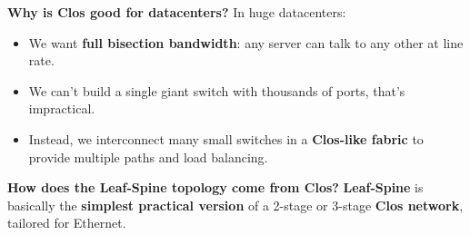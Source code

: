 \highspace
\textcolor{Green3}{ \textbf{Why is Clos good for datacenters?}} In huge datacenters:
\begin{itemize}
    \item We want \textbf{full bisection bandwidth}: any server can talk to any other at line rate.
    \item We can't build a single giant switch with thousands of ports, that's impractical.
    \item Instead, we interconnect many small switches in a \textbf{Clos-like fabric} to provide multiple paths and load balancing.
\end{itemize}

\highspace
\textcolor{Green3}{ \textbf{How does the Leaf-Spine topology come from Clos?}} \textbf{Leaf-Spine} is basically the \textbf{simplest practical version} of a 2-stage or 3-stage \textbf{Clos network}, tailored for Ethernet.

